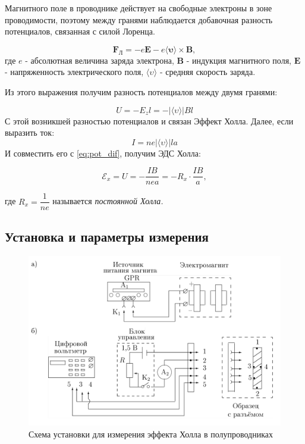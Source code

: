 \documentclass[a4paper, 12pt]{article}
\begin{document}
Магнитного поле в проводнике действует на свободные электроны в зоне проводимости, поэтому между гранями наблюдается добавочная разность потенциалов, связанная с силой Лоренца. 

$$\boldsymbol{F_\text{Л}}  = -e \boldsymbol{E} - e \langle \boldsymbol{\upsilon} \rangle \times \boldsymbol{B},$$
где $e$ - абсолютная величина заряда электрона, $\boldsymbol{B}$ - индукция магнитного поля, $\boldsymbol{E}$ - напряженность электрического поля, $ \langle \upsilon \rangle$ - средняя скорость заряда.

Из этого выражения получим разность потенциалов между двумя гранями:

\begin{equation}
U = -E_zl = - | \langle \upsilon \rangle | B l
\label{eq:pot_dif}
\end{equation}
С этой возникшей разностью потенциалов и связан Эффект Холла.
Далее, если выразить ток:
$$ I = ne |\langle \upsilon \rangle |  l a$$
И совместить его с \ref{eq:pot_dif}, получим ЭДС Холла:

\begin{equation}
\mathscr{E}_x = U = - \dfrac{IB}{nea} = -R_x \cdot \dfrac{IB}{a},
\label{eq: Hall}
\end{equation}

где $R_x = \dfrac{1}{ne}$ называется \textit{постоянной Холла.}

\subsection*{Установка и параметры измерения}

\begin{figure}
\includegraphics[width = 0.7 \textwidth]{Scheme1}
			\caption{Схема установки для измерения эффекта Холла в полупроводниках}
\end{figure} 
\end{document}

